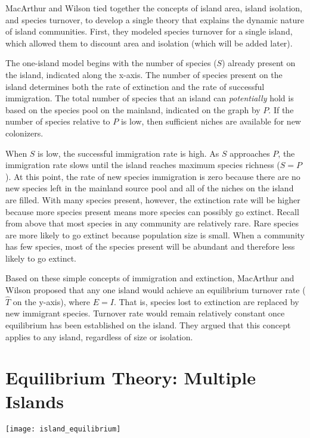 \documentclass[letterpaper]{tufte-handout}
\begin{document}
MacArthur and Wilson tied together the concepts of island area, island isolation, and species turnover, to develop a single theory that explains the dynamic nature of island communities. First, they modeled species turnover for a single island, which allowed them to discount area and isolation (which will be added later).

The one-island model begins with the number of species ($S$) already present on the island, indicated along the x-axis.  The number of species present on the island determines both the rate of extinction and the rate of successful immigration.   The total number of species that an island can \textit{potentially} hold is based on the  species pool on the mainland, indicated on the graph by $P$. If the number of species relative to $P$ is low, then sufficient niches are available for new colonizers.  

When $S$ is low, the successful immigration rate is high. As $S$ approaches $P$, the immigration rate slows until the island reaches maximum species richness ($S=P$).  At this point, the rate of new species immigration is zero because there are no new species left in the mainland source pool and all of the niches on the island are filled. With many species present, however, the extinction rate will be higher because more species present means more species can possibly go extinct. Recall from above that most species in any community are relatively rare.  Rare species are more likely to go extinct because population size is small. When a community has few species, most of the species present will be abundant and therefore less likely to go extinct.

Based on these simple concepts of immigration and extinction, MacArthur and Wilson proposed that any one island would achieve an equilibrium turnover rate ($\hat{T}$ on the y-axis), where $E=I$. That is, species lost to extinction are replaced by new immigrant species. Turnover rate would remain relatively constant once equilibrium has been established on the island. They argued that this concept applies to any island, regardless of size or isolation.

\section{Equilibrium Theory: Multiple Islands}
\begin{marginfigure}%
	\centering
	\texttt{[image: island\_equilibrium]}
\end{marginfigure} 
\end{document}
